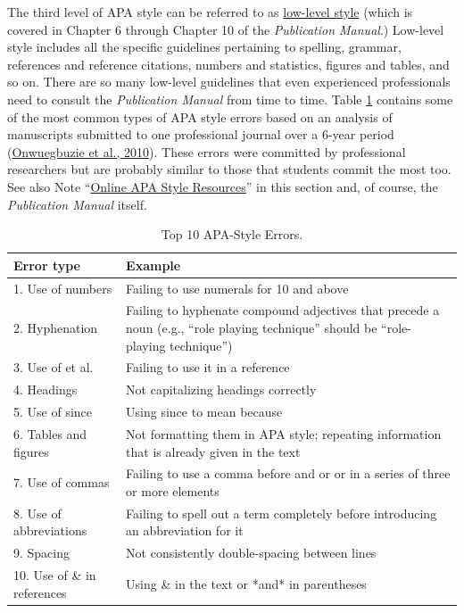 \documentclass[
]{krantz}
\begin{document}
The third level of APA style can be referred to as \protect\hyperlink{low-level-style}{low-level style} (which is covered in Chapter 6 through Chapter 10 of the \emph{Publication Manual}.) Low-level style includes all the specific guidelines pertaining to spelling, grammar, references and reference citations, numbers and statistics, figures and tables, and so on. There are so many low-level guidelines that even experienced professionals need to consult the \emph{Publication Manual} from time to time. Table \ref{tab:errors} contains some of the most common types of APA style errors based on an analysis of manuscripts submitted to one professional journal over a 6-year period (\protect\hyperlink{ref-onwuegbuzie2010evidence}{Onwuegbuzie et al., 2010}). These errors were committed by professional researchers but are probably similar to those that students commit the most too. See also Note ``\protect\hyperlink{online-apa-style-resources}{Online APA Style Resources}'' in this section and, of course, the \emph{Publication Manual} itself.

\begin{table}

\caption{\label{tab:errors}Top 10 APA-Style Errors.}
\centering
\begin{tabular}[t]{l|l}
\hline
Error type & Example\\
\hline
1. Use of numbers & Failing to use numerals for 10 and above\\
\hline
2. Hyphenation & Failing to hyphenate compound adjectives that precede a noun (e.g., “role playing technique” should be “role-playing technique”)\\
\hline
3. Use of et al. & Failing to use it in a reference\\
\hline
4. Headings & Not capitalizing headings correctly\\
\hline
5. Use of since & Using since to mean because\\
\hline
6. Tables and figures & Not formatting them in APA style; repeating information that is already given in the text\\
\hline
7. Use of commas & Failing to use a comma before and or or in a series of three or more elements\\
\hline
8. Use of abbreviations & Failing to spell out a term completely before introducing an abbreviation for it\\
\hline
9. Spacing & Not consistently double-spacing between lines\\
\hline
10. Use of \& in references & Using \& in the text or *and* in parentheses\\
\hline
\end{tabular}
\end{table}
\end{document}
